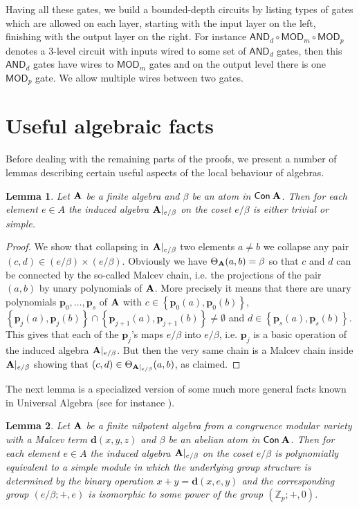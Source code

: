 \documentclass[11pt,a4paper]{amsart}
\newtheorem{lm}{Lemma}[section]
\newcommand{\m}[1]{{\uppercase {\bf{#1}}}}
\newcommand{\set}[1]{{\left\{ {#1} \right\} }}
\newcommand{\con}[1]{{\sf Con\:\m{#1}}}
\newcommand{\po}[1]{{\mathbf {#1}}}
\newcounter{note}
\newcounter{claim}
\newcommand{\z}{\mathbb{Z}}
\newcommand{\zero}{e}
\newcommand{\ccand}{\mathsf{AND}}
\newcommand{\ccmod}{\mathsf{MOD}}
\begin{document}
Having all these gates, we build a bounded-depth circuits by listing types of gates which are allowed on each layer, starting with the input layer on the left, finishing with the output layer on the right. For instance $\ccand_d\circ\ccmod_m\circ\ccmod_p$ denotes a $3$-level circuit with inputs wired to some set of $\ccand_d$ gates, then this  $\ccand_d$ gates have wires to $\ccmod_m$ gates and on the output level there is one $\ccmod_p$ gate. We allow multiple wires between two gates.

\section{Useful algebraic facts}
\label{section:collection}

Before dealing with the remaining parts of the proofs, we present a number of lemmas describing certain useful aspects of the local behaviour of algebras. 


\begin{lm}
\label{lm:simple-atom}
Let $\m A$ be a finite algebra and $\beta$ be an atom in $\con A$.
Then for each element $\zero\in A$ the induced algebra $\m A|_{\zero/\beta}$
on the coset $\zero/\beta$
is either trivial or simple.
\end{lm}
\begin{proof}
We show that collapsing in $\m A|_{\zero/\beta}$ two elements $a\neq b$ we collapse any pair
$(c,d)\in (\zero/\beta)\times(\zero/\beta)$.
Obviously we have $\Theta_{\m A}(a,b)=\beta$ so that $c$ and $d$ can be connected by the so-called Malcev chain, i.e. the projections of the pair $(a,b)$ by unary polynomials of $\m A$.
More precisely it means that there are unary polynomials $\po p_0,\ldots,\po p_s$ of $\m A$ with
$c\in\set{\po p_0(a),\po p_0(b)}$,
$\set{\po p_j(a),\po p_j(b)}\cap\set{\po p_{j+1}(a),\po p_{j+1}(b)}\neq\emptyset$ and
$d\in\set{\po p_s(a),\po p_s(b)}$.
This gives that each of the $\po p_j$'s maps $\zero/\beta$ into $\zero/\beta$,
i.e. $\po p_j$ is a basic operation of the induced algebra $\m A|_{\zero/\beta}$.
But then the very same chain is a Malcev chain inside $\m A|_{\zero/\beta}$
showing that $(c,d)\in \Theta_{\m A|_{\zero/\beta}}(a,b)$, as claimed.
\end{proof}


The next lemma is a specialized version of some much more general facts known in Universal Algebra (see for instance \cite[Corollary 5.8]{fm}).


\begin{lm}
\label{lm:simple-module-atom}
Let $\m A$ be a finite nilpotent algebra from a congruence modular variety
with a Malcev term $\po d(x,y,z)$
and $\beta$ be an abelian atom in $\con A$.
Then for each element $\zero\in A$ the induced algebra $\m A|_{\zero/\beta}$ on the coset $\zero/\beta$ is polynomially equivalent to a simple module in which the underlying group structure is determined by the binary operation $x+y=\po d(x,\zero,y)$
and the corresponding group $(\zero/\beta; +,\zero)$
is isomorphic to some power of the group $(\z_p;+,0)$.
\end{lm}
\end{document}
